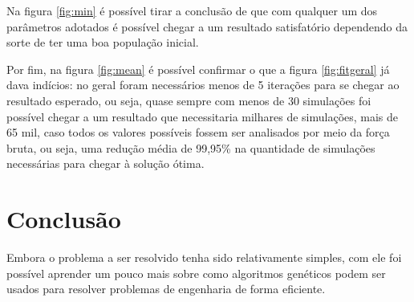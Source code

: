 \documentclass[12pt]{article}
\begin{document}
Na figura \ref{fig:min} é possível tirar a conclusão de que com qualquer um dos parâmetros adotados é possível chegar a um resultado satisfatório dependendo da sorte de ter uma boa população inicial.

Por fim, na figura \ref{fig:mean} é possível confirmar o que a figura \ref{fig:fitgeral} já dava indícios: no geral foram necessários menos de 5 iterações para se chegar ao resultado esperado, ou seja, quase sempre com menos de 30 simulações foi possível chegar a um resultado que necessitaria milhares de simulações, mais de 65 mil, caso todos os valores possíveis fossem ser analisados por meio da força bruta, ou seja, uma redução média de 99,95\% na quantidade de simulações necessárias para chegar à solução ótima.

\section{Conclusão}

Embora o problema a ser resolvido tenha sido relativamente simples, com ele foi possível aprender um pouco mais sobre como algoritmos genéticos podem ser usados para resolver problemas de engenharia de forma eficiente.

\clearpage

\end{document}
